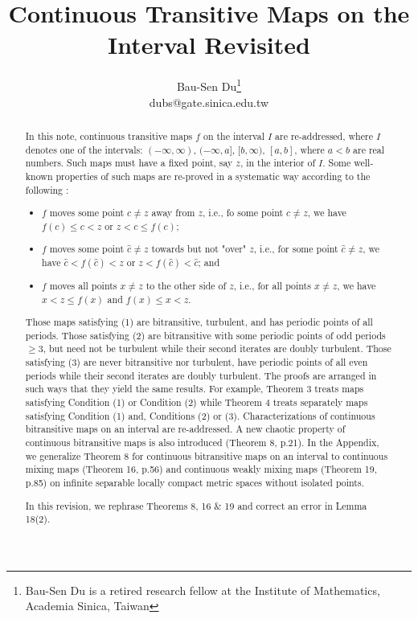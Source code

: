 \documentclass[12pt]{article}
\date{}
\begin{document}
\title{Continuous Transitive Maps on the Interval Revisited}                       
\author{Bau-Sen Du\footnote {Bau-Sen Du is a retired research fellow at the Institute of Mathematics, Academia Sinica, Taiwan} \\ [.5cm] 
dubs@gate.sinica.edu.tw \cr}
\maketitle

\begin{abstract}
In this note, continuous transitive maps $f$ on the interval $I$ are re-addressed, where $I$ denotes one of the intervals: $(-\infty, \infty)$, $(-\infty, a]$, $[b, \infty)$, $[a, b]$, where $a < b$ are real numbers.  Such maps must have a fixed point, say $z$, in the interior of $I$.  Some well-known properties of such maps are re-proved in a systematic way according to the following : 
\begin{itemize}
\item[(1)] $f$ moves some point $c \ne z$ away from $z$, i.e., fo some point $c \ne z$, we have $f(c) \le c < z$ or $z < c \le f(c)$; 

\item[(2)] $f$ moves some point $\hat c \ne z$ towards but not "over" $z$, i.e., for some point $\hat c \ne z$, we have $\hat c < f(\hat c) < z$ or $z < f(\hat c) < \hat c$; and 

\item[(3)] $f$ moves all points $x \ne z$ to the other side of $z$, i.e., for all points $x \ne z$, we have $x < z \le f(x)$ and $f(x) \le x < z$.  
\end{itemize}
Those maps satisfying (1) are bitransitive, turbulent, and has periodic points of all periods.  Those satisfying (2) are bitransitive with some periodic points of odd periods $\ge 3$, but need not be turbulent while their second iterates are doubly turbulent.  Those satisfying (3) are never bitransitive nor turbulent, have periodic points of all even periods while their second iterates are doubly turbulent.  The proofs are arranged in such ways that they yield the same results.  For example, Theorem 3 treats maps satisfying Condition (1) or Condition (2) while Theorem 4 treats separately maps satisfying Condition (1) and, Conditions (2) or (3).  Characterizations of continuous bitransitive maps on an interval are re-addressed.  A new chaotic property of continuous bitransitive maps is also introduced (Theorem 8, p.21).  In the Appendix, we generalize Theorem 8 for continuous bitransitive maps on an interval to continuous mixing maps (Theorem 16, p.56) and continuous weakly mixing maps (Theorem 19, p.85) on infinite separable locally compact metric spaces without isolated points.  

In this revision, we rephrase Theorems 8, 16 $\&$ 19 and correct an error in Lemma 18(2).
\end{abstract}
\end{document}
